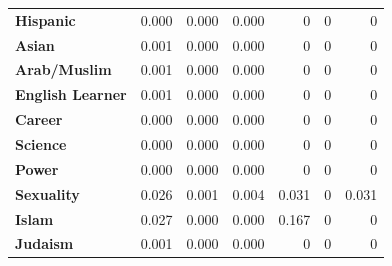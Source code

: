 \begin{table}[!h]
\begin{tabular}{l|rrrrrr}
\rowcolor[HTML]{FFFFFF} 
\textbf{Hispanic} & {\color[HTML]{330001} 0.000} & {\color[HTML]{330001} 0.000} & {\color[HTML]{330001} 0.000} & {\color[HTML]{330001} 0} & {\color[HTML]{330001} 0} & {\color[HTML]{330001} 0} \\
\rowcolor[HTML]{FAEEED} 
\textbf{Asian} & {\color[HTML]{330001} 0.001} & {\color[HTML]{330001} 0.000} & {\color[HTML]{330001} 0.000} & {\color[HTML]{330001} 0} & {\color[HTML]{330001} 0} & {\color[HTML]{330001} 0} \\
\rowcolor[HTML]{FFFFFF} 
\textbf{Arab/Muslim} & {\color[HTML]{330001} 0.001} & {\color[HTML]{330001} 0.000} & {\color[HTML]{330001} 0.000} & {\color[HTML]{330001} 0} & {\color[HTML]{330001} 0} & {\color[HTML]{330001} 0} \\
\rowcolor[HTML]{FAEEED} 
\textbf{English Learner} & {\color[HTML]{330001} 0.001} & {\color[HTML]{330001} 0.000} & {\color[HTML]{330001} 0.000} & {\color[HTML]{330001} 0} & {\color[HTML]{330001} 0} & {\color[HTML]{330001} 0} \\ \hline
\rowcolor[HTML]{FFFFFF} 
{\color[HTML]{000000} \textbf{Career}} & {\color[HTML]{000000} 0.000} & {\color[HTML]{000000} 0.000} & {\color[HTML]{000000} 0.000} & {\color[HTML]{000000} 0} & {\color[HTML]{000000} 0} & {\color[HTML]{000000} 0} \\
\rowcolor[HTML]{EFEFEF} 
{\color[HTML]{000000} \textbf{Science}} & {\color[HTML]{000000} 0.000} & {\color[HTML]{000000} 0.000} & {\color[HTML]{000000} 0.000} & {\color[HTML]{000000} 0} & {\color[HTML]{000000} 0} & {\color[HTML]{000000} 0} \\
\rowcolor[HTML]{FFFFFF} 
{\color[HTML]{000000} \textbf{Power}} & {\color[HTML]{000000} 0.000} & {\color[HTML]{000000} 0.000} & {\color[HTML]{000000} 0.000} & {\color[HTML]{000000} 0} & {\color[HTML]{000000} 0} & {\color[HTML]{000000} 0} \\
\rowcolor[HTML]{EFEFEF} 
{\color[HTML]{000000} \textbf{Sexuality}} & {\color[HTML]{000000} 0.026} & {\color[HTML]{000000} 0.001} & {\color[HTML]{000000} 0.004} & {\color[HTML]{000000} 0.031} & {\color[HTML]{000000} 0} & {\color[HTML]{000000} 0.031} \\ \hline
\rowcolor[HTML]{FFFFFF} 
{\color[HTML]{000000} \textbf{Islam}} & {\color[HTML]{000000} 0.027} & {\color[HTML]{000000} 0.000} & {\color[HTML]{000000} 0.000} & {\color[HTML]{000000} 0.167} & {\color[HTML]{000000} 0} & {\color[HTML]{000000} 0} \\
\rowcolor[HTML]{D7F8D7} 
{\color[HTML]{000000} \textbf{Judaism}} & {\color[HTML]{000000} 0.001} & {\color[HTML]{000000} 0.000} & {\color[HTML]{000000} 0.000} & {\color[HTML]{000000} 0} & {\color[HTML]{000000} 0} & {\color[HTML]{000000} 0} \\

\end{tabular}
\end{table}
